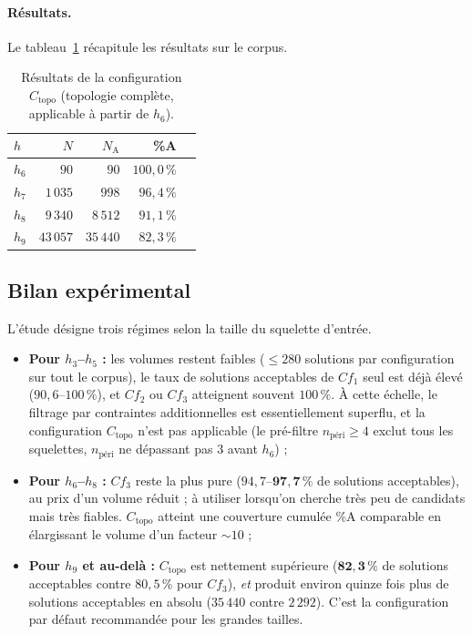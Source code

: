 \documentclass[11pt,a4paper]{article}
\begin{document}
\paragraph{Résultats.}
Le tableau~\ref{tab:res-ctopo} récapitule les résultats sur le corpus.

\begin{table}[h]
\centering
\small
\begin{tabular}{lrrrr}
\toprule
$h$ & $N$ & $N_{\text{A}}$ & \%A \\
\midrule
$h_6$ & $90$      & $90$      & $100{,}0\,\%$ \\
$h_7$ & $1\,035$  & $998$     & $96{,}4\,\%$  \\
$h_8$ & $9\,340$  & $8\,512$  & $91{,}1\,\%$  \\
$h_9$ & $43\,057$ & $35\,440$ & $82{,}3\,\%$  \\
\bottomrule
\end{tabular}
\caption{Résultats de la configuration $C_{\text{topo}}$ (topologie complète,
applicable à partir de $h_6$).}
\label{tab:res-ctopo}
\end{table}
\subsection{Bilan expérimental}

L'étude désigne trois régimes selon la taille du squelette d'entrée.

\begin{itemize}[leftmargin=1.4em]
  \item \textbf{Pour $h_3$--$h_5$ :} les volumes restent faibles ($\le 280$
    solutions par configuration sur tout le corpus), le taux de solutions
    acceptables de $Cf_1$ seul est déjà élevé ($90{,}6$--$100\,\%$), et
    $Cf_2$ ou $Cf_3$ atteignent souvent $100\,\%$. À cette échelle, le
    filtrage par contraintes additionnelles est essentiellement superflu,
    et la configuration $C_{\text{topo}}$ n'est pas applicable (le
    pré-filtre $n_{\text{péri}} \ge 4$ exclut tous les squelettes,
    $n_{\text{péri}}$ ne dépassant pas $3$ avant $h_6$) ;
  \item \textbf{Pour $h_6$--$h_8$ :} $Cf_3$ reste la plus pure
    ($94{,}7$--$\mathbf{97{,}7}\,\%$ de solutions acceptables), au prix
    d'un volume réduit ; à utiliser lorsqu'on cherche très peu de
    candidats mais très fiables. $C_{\text{topo}}$ atteint une couverture
    cumulée \%A comparable en élargissant le volume d'un facteur $\sim 10$ ;
  \item \textbf{Pour $h_9$ et au-delà :} $C_{\text{topo}}$ est nettement
    supérieure ($\mathbf{82{,}3\,\%}$ de solutions acceptables contre
    $80{,}5\,\%$ pour $Cf_3$), \emph{et} produit environ quinze fois plus
    de solutions acceptables en absolu ($35\,440$ contre $2\,292$). C'est
    la configuration par défaut recommandée pour les grandes tailles.
\end{itemize}
\end{document}
